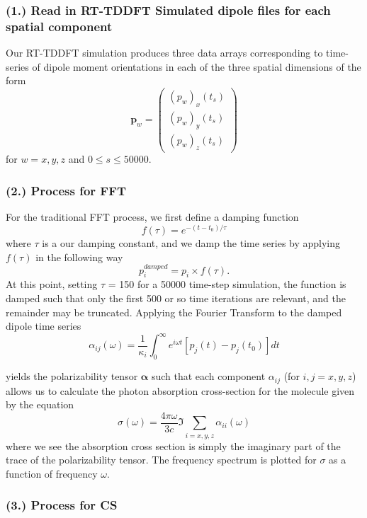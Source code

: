 \documentclass[11pt]{article}
\begin{document}
\subsubsection*{(1.)	Read in RT-TDDFT Simulated dipole files for each spatial component}
Our RT-TDDFT simulation produces three data arrays corresponding to time-series of dipole moment orientations in each of the three spatial dimensions of the form
$$\mathbf{p}_{w}= \begin{pmatrix} (p_{w})_{x}(t_{s})\\  (p_{w})_{y}(t_{s}) \\  (p_{w})_{z}(t_{s})\end{pmatrix}$$
for $w = x, y, z$ and $0 \leq s \leq 50000$.

\subsubsection*{(2.)	Process for FFT}
For the traditional FFT process, we first define a damping function 
$$f(\tau) = e^{-(t - t_{0}) / \tau}$$
where $\tau$ is a our damping constant, and we damp the time series by applying $f(\tau)$ in the following way
$$p_{i}^{damped} = p_{i} \times f(\tau).$$
At this point, setting $\tau$ = 150 for a 50000 time-step simulation, the function is damped such that only the first 500 or so time iterations are relevant, and the remainder may be truncated.  Applying the Fourier Transform to the damped dipole time series 
$$\alpha_{ij}(\omega) = \frac{1}{\kappa_{i}}\int_{0}^{\infty}  e^{i\omega t} [p_{j}(t) - p_{j}(t_{0})] dt$$ 

yields the polarizability tensor $\mathbf{\alpha}$ such that each component $\alpha_{ij}$ (for $i,j = x,y,z$) allows us to calculate the photon absorption cross-section for the molecule given by the equation
$$\sigma(\omega) = \frac{4 \pi \omega}{3c}  \Im\sum_{i = x, y, z} \alpha_{ii}(\omega)$$
where we see the absorption cross section is simply the imaginary part of the trace of the polarizability tensor.  The frequency spectrum is plotted for $\sigma$ as a function of frequency $\omega$.

\subsubsection*{(3.)	Process for CS}
\end{document}
